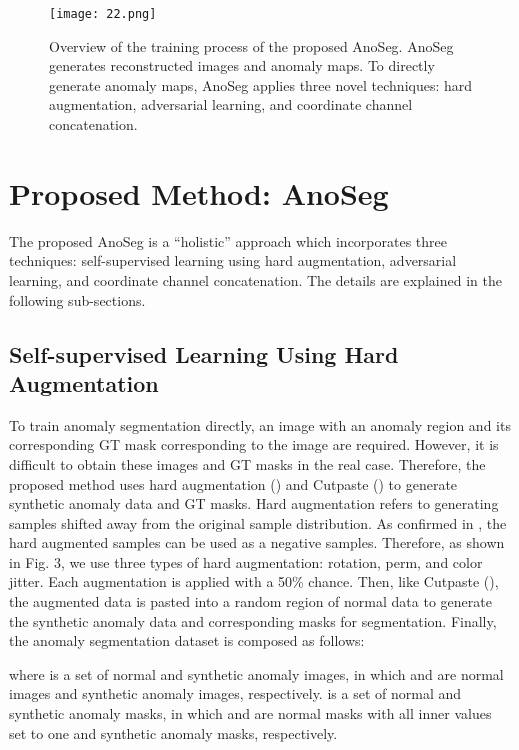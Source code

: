 \documentclass{article} \usepackage{iclr2022_conference,times}
\begin{document}
\begin{figure}[t]
\begin{center}
\texttt{[image: 22.png]} 
\end{center}
   \caption{Overview of the training process of the proposed AnoSeg. AnoSeg generates reconstructed images and anomaly maps. To directly generate anomaly maps, AnoSeg applies three novel techniques: hard augmentation, adversarial learning, and coordinate channel concatenation.}
\label{fig2}
\vspace{-0.4cm}
\end{figure}



\section{Proposed Method: AnoSeg}
The proposed AnoSeg is a ``holistic'' approach which incorporates three techniques: self-supervised learning using hard augmentation, adversarial learning, and coordinate channel concatenation. The details are explained in the following sub-sections.



\subsection{Self-supervised Learning Using Hard Augmentation}
To train anomaly segmentation directly, an image with an anomaly region and its corresponding GT mask corresponding to the image are required. However, it is difficult to obtain these images and GT masks in the real case. Therefore, the proposed method uses hard augmentation (\cite{csi}) and Cutpaste (\cite{cut}) to generate synthetic anomaly data and GT masks. Hard augmentation refers to generating samples shifted away from the original sample distribution. As confirmed in \cite{csi}, the hard augmented samples can be used as a negative samples. Therefore, as shown in Fig. 3, we use three types of hard augmentation: rotation, perm, and color jitter. Each augmentation is applied with a 50\% chance. Then, like Cutpaste (\cite{cut}), the augmented data is pasted into a random region of normal data to generate the synthetic anomaly data and corresponding masks for segmentation. Finally, the anomaly segmentation dataset is composed as follows:

where  is a set of normal and synthetic anomaly images, in which  and  are normal images and synthetic anomaly images, respectively.  is a set of normal and synthetic anomaly masks, in which  and  are normal masks with all inner values set to one and synthetic anomaly masks, respectively.
\end{document}
